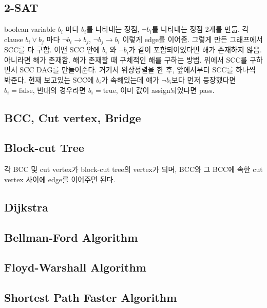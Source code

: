 \documentclass[8pt,landscape,a4paper,twocolumn]{article}
\begin{document}
\subsection{2-SAT}
boolean variable $b_{i}$ 마다 $b_{i}$를 나타내는 정점, $\neg b_{i} $를 나타내는 정점 2개를 만듦. 각 clause $b_{i} \lor b_{j}$ 마다 $\neg b_{i} \to b_{j}$, $\neg b_{j} \to b_{i}$ 이렇게 edge를 이어줌. 그렇게 만든 그래프에서 SCC를 다 구함. 어떤 SCC 안에 $b_{i}$ 와 $\neg b_{i}$가 같이 포함되어있다면 해가 존재하지 않음. 아니라면 해가 존재함. 해가 존재할 때 구체적인 해를 구하는 방법. 위에서 SCC를 구하면서 SCC DAG를 만들어준다. 거기서 위상정렬을 한 후, 앞에서부터 SCC를 하나씩 봐준다. 현재 보고있는 SCC에 $b_{i}$가 속해있는데 얘가 $\neg b_{i}$보다 먼저 등장했다면 $b_{i} = \mathrm{false}$, 반대의 경우라면 $b_{i} = \mathrm{true}$, 이미 값이 assign되었다면 pass.

\subsection{BCC, Cut vertex, Bridge}


\subsection{Block-cut Tree}

각 BCC 및 cut vertex가 block-cut tree의 vertex가 되며, BCC와 그 BCC에 속한 cut vertex 사이에 edge를 이어주면 된다.

\subsection{Dijkstra}


\subsection{Bellman-Ford Algorithm}


\subsection{Floyd-Warshall Algorithm}


\subsection{Shortest Path Faster Algorithm}

\end{document}
